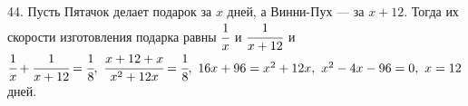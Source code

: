 44. Пусть Пятачок делает подарок за $x$ дней, а Винни-Пух --- за $x+12.$ Тогда их скорости изготовления подарка равны $\cfrac{1}{x}$ и $\cfrac{1}{x+12}$ и $\cfrac{1}{x}+\cfrac{1}{x+12}=\cfrac{1}{8},\ \cfrac{x+12+x}{x^2+12x}=\cfrac{1}{8},\ 16x+96=x^2+12x,\ x^2-4x-96=0,\ x=12$ дней.\\
